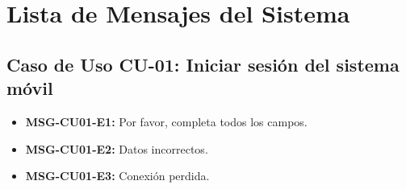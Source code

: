 
\newpage


\newpage


\newpage


\newpage

%
\newpage


\newpage


\newpage


\newpage


\newpage


\newpage


\newpage


\newpage


\newpage


\newpage


\newpage


\newpage


\newpage


\newpage


\newpage


\newpage


\newpage


\newpage


\newpage


\newpage


\newpage

\section{Lista de Mensajes del Sistema}

\subsection{Caso de Uso CU-01: Iniciar sesión del sistema móvil}
\begin{itemize}
	\item \textbf{\label{msg:CU01-E1}MSG-CU01-E1:} Por favor, completa todos los campos.
	\item \textbf{\label{msg:CU01-E2}MSG-CU01-E2:} Datos incorrectos.
	\item \textbf{\label{msg:CU01-E3}MSG-CU01-E3:} Conexión perdida.
\end{itemize}


